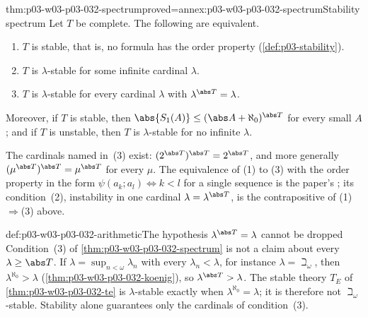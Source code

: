 \begin{hbtheorem}{thm:p03-w03-p03-032-spectrum}{proved=annex:p03-w03-p03-032-spectrum}{Stability spectrum}
Let \(T\) be complete.  The following are equivalent.
\begin{enumerate}
  \item \(T\) is stable, that is, no formula has the order property
        (\cref{def:p03-stability}).
  \item \(T\) is \(\lambda\)-stable for some infinite cardinal \(\lambda\).
  \item \(T\) is \(\lambda\)-stable for every cardinal \(\lambda\) with
        \(\lambda^{\abs T}=\lambda\).
\end{enumerate}
Moreover, if \(T\) is stable, then
\(\abs{S_1(A)}\leq(\abs A+\aleph_0)^{\abs T}\) for every small \(A\); and if
\(T\) is unstable, then \(T\) is \(\lambda\)-stable for no infinite
\(\lambda\).
\end{hbtheorem}

The cardinals named in~(3) exist: \((2^{\abs T})^{\abs T}=2^{\abs T}\), and
more generally \((\mu^{\abs T})^{\abs T}=\mu^{\abs T}\) for every \(\mu\).
The equivalence of (1) to (3) with the order property in the form
\(\psi(a_k;a_l)\Leftrightarrow k<l\) for a single sequence is the paper's
\cite[Theorem~2.13, pp.~304--305]{Shelah1971Stability}; its condition~(2),
instability in one cardinal \(\lambda=\lambda^{\abs T}\), is the
contrapositive of (1)\(\Rightarrow\)(3) above.

\begin{hbwarning}{def:p03-w03-p03-032-arithmetic}{The hypothesis \(\lambda^{\abs T}=\lambda\) cannot be dropped}
Condition~(3) of \cref{thm:p03-w03-p03-032-spectrum} is not a claim about
every \(\lambda\geq\abs T\).  If \(\lambda=\sup_{n<\omega}\lambda_n\) with
every \(\lambda_n<\lambda\), for instance \(\lambda=\beth_\omega\), then
\(\lambda^{\aleph_0}>\lambda\) (\cref{thm:p03-w03-p03-032-koenig}), so
\(\lambda^{\abs T}>\lambda\).  The stable theory \(T_E\) of
\cref{thm:p03-w03-p03-032-te} is \(\lambda\)-stable exactly when
\(\lambda^{\aleph_0}=\lambda\); it is therefore not
\(\beth_\omega\)-stable.  Stability alone guarantees only the cardinals of
condition~(3).
\end{hbwarning}

